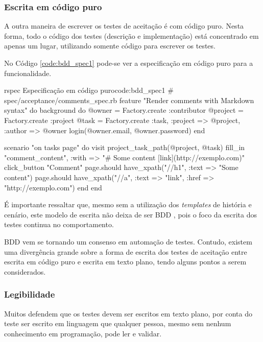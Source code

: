 

\subsubsection{Escrita em código puro} %
\label{subsub:Escrita em codigo puro}

A outra maneira de escrever os testes de aceitação é com código puro. Nesta forma, todo o código dos testes (descrição e implementação) está concentrado em apenas um lugar, utilizando somente código para escrever os testes.

No Código \ref{code:bdd_spec1} pode-se ver a especificação em código puro para a funcionalidade.

\begin{mycode}{rspec}%
{Especificação em código puro}{code:bdd_spec1}
# spec/acceptance/comments_spec.rb
feature "Render comments with Markdown syntax" do
  background do
    @owner = Factory.create :contributor
    @project = Factory.create :project
    @task = Factory.create :task, :project => @project, :author => @owner
    login(@owner.email, @owner.password)
  end

  scenario "on tasks page" do
    visit project_task_path(@project, @task)
    fill_in "comment_content", :with => "# Some content [link](http://exemplo.com)"
    click_button "Comment"
    page.should have_xpath("//h1", :text => "Some content")
    page.should have_xpath("//a", :text => "link", :href => "http://exemplo.com")
  end
end
\end{mycode}

É importante ressaltar que, mesmo sem a utilização dos \textit{templates} de história e cenário, este modelo de escrita não deixa de ser BDD \cite{BDDSolis}, pois o foco da escrita dos testes continua no comportamento.

BDD vem se tornando um consenso em automação de testes. Contudo, existem uma divergência grande sobre a forma de escrita dos testes de aceitação entre escrita em código puro e escrita em texto plano, tendo alguns pontos a serem considerados.


\subsubsection{Legibilidade} %
\label{subsub:legibilidade}

Muitos defendem que os testes devem ser escritos em texto plano, por conta do teste ser escrito em linguagem que qualquer pessoa, mesmo sem nenhum conhecimento em programação, pode ler e validar.

